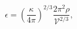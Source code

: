 \begin{equation}
\epsilon = \left( \frac{\kappa}{4 \pi} \right)^{2/3} \frac{2 \pi^{2}
\rho}{\mathcal{V}^{2/3}},
\end{equation}

